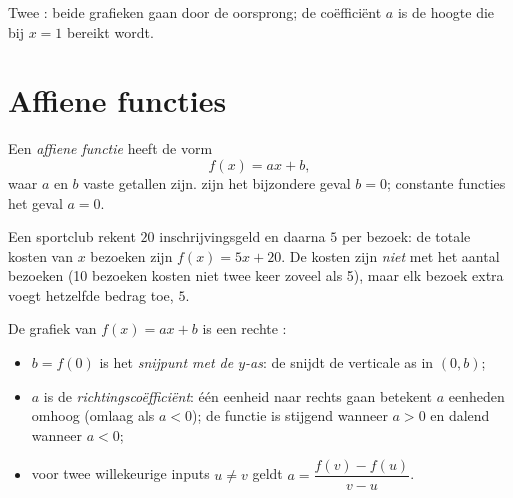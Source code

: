 \begin{omfigure}

{\small Twee : beide grafieken gaan door de oorsprong; de
coëfficiënt $a$ is de hoogte die bij $x = 1$ bereikt wordt.}
\end{omfigure}

\section{Affiene functies}

\begin{definition}\label{def:g9:linfunc:affine}
Een \emph{affiene functie} heeft de vorm
\[
f(x) = a x + b ,
\]
waar $a$ en $b$ vaste getallen zijn.  zijn het bijzondere geval
$b = 0$; constante functies het geval $a = 0$.
\end{definition}

\begin{example}
Een sportclub rekent $20$ inschrijvingsgeld en daarna $5$ per bezoek: de totale
kosten van $x$ bezoeken zijn $f(x) = 5x + 20$. De kosten zijn \emph{niet}
 met het aantal bezoeken (10 bezoeken kosten niet twee keer zoveel als
5), maar elk bezoek extra voegt hetzelfde bedrag toe, $5$.
\end{example}

\begin{proposition}\label{prop:g9:linfunc:affinegraph}
De grafiek van $f(x) = ax + b$ is een rechte :
\begin{itemize}
  \item $b = f(0)$ is het \emph{snijpunt met de $y$-as}: de  snijdt de
        verticale as in $(0, b)$;
  \item $a$ is de \emph{richtingscoëfficiënt}: één
        eenheid naar rechts gaan betekent $a$ eenheden omhoog (omlaag als
        $a < 0$); de functie is stijgend wanneer $a > 0$ en dalend wanneer
        $a < 0$;
  \item voor twee willekeurige inputs $u \neq v$ geldt
        $a = \dfrac{f(v) - f(u)}{v - u}$.
\end{itemize}
\end{proposition}

